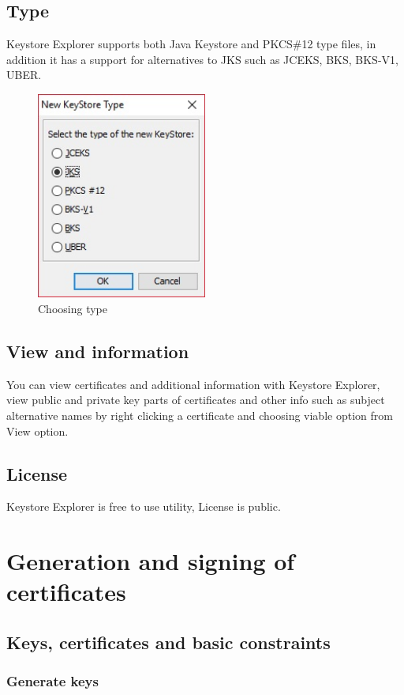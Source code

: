 \documentclass[10pt, a4paper]{report}
\begin{document}
  \subsection{Type}
Keystore Explorer supports both Java Keystore and PKCS\#12 type files, in addition it has a support for alternatives to JKS such as JCEKS, BKS, BKS-V1, UBER.
\begin{figure}[!ht]
 \caption{Choosing type}
 \centering
  \includegraphics[width=0.5\textwidth]{../Dependancies/Keystore_Explorer/Type.jpg}
\end{figure}
  \subsection{View and information}
You can view certificates and additional information with Keystore Explorer, view public and private key parts of certificates and other info such as subject alternative names by right clicking a certificate and choosing viable option from View option.
  \subsection{License}
Keystore Explorer is free to use utility, License is public.
  
\section{Generation and signing of certificates}

  \subsection{Keys, certificates and basic constraints}
  
    \subsubsection{Generate keys}
    
\end{document}
